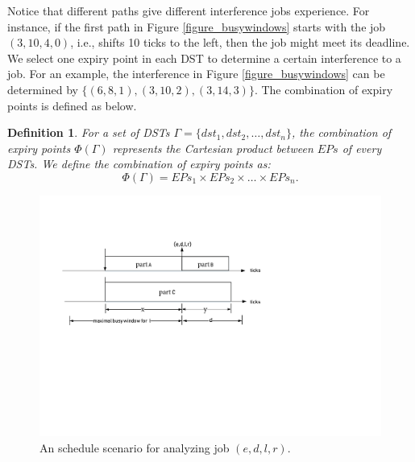 \documentclass[10pt,conference]{IEEEtran}
\newtheorem{definition}{Definition}
\begin{document}
Notice that different paths give different interference jobs experience. For instance, if the first path in Figure \ref{figure_busywindows} starts with the job $(3,10,4,0)$, i.e., shifts 10 ticks to the left, then the job might meet its deadline. %
We select one expiry point in each DST to determine a certain interference to a job. For an example, the interference in Figure \ref{figure_busywindows} can be determined by $\{(6,8,1),(3,10,2),(3,14,3)\}$. The combination of expiry points is defined as below.

\begin{definition}
For a set of DSTs $\Gamma=\{dst_1,dst_2,\dots,dst_n\}$, the combination of expiry points $\Phi(\Gamma)$ represents the Cartesian product between $EPs$ of every DSTs. We define the combination of expiry points as:
\begin{equation}
  \Phi(\Gamma)=EPs_1 \times EPs_2\times\dots\times EPs_n.
\end{equation}\label{equation_combination}
\end{definition}


\begin{figure}
  \centering
  \includegraphics[scale=0.5]{graphics/figure_3parts.pdf}
  \caption{An schedule scenario for analyzing job $(e,d,l,r)$.}
  \label{figure_3parts}
\end{figure}
\end{document}
